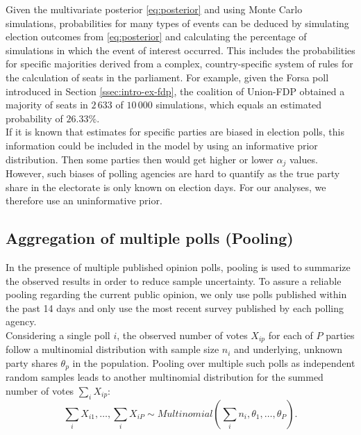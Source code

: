 \documentclass[smallcondensed]{svjour3}     %
\begin{document}
Given the multivariate posterior \eqref{eq:posterior} and using Monte Carlo simulations,
probabilities for many types of events can be deduced by simulating election outcomes
from \eqref{eq:posterior} and calculating the percentage of simulations in which the
event of interest occurred. This includes the probabilities for specific
majorities derived from a complex, country-specific system of rules for the
calculation of seats in the parliament. For example, given the Forsa poll
introduced in Section \ref{ssec:intro-ex-fdp}, the coalition of Union-FDP
obtained a majority of seats in $2\,633$ of $10\,000$ simulations, which equals
an estimated probability of $26.33\%$.\\

If it is known that estimates for specific parties are biased in election polls,
this information could be included in the model by using an informative prior distribution.
Then some  parties then would get higher or lower $\alpha_j$ values.
However, such biases of polling agencies are hard to quantify as the true party
share in the electorate is only known on election days. For our analyses, we
therefore use an uninformative prior.


\subsection{Aggregation of multiple polls (Pooling)} \label{sec:pooling}
In the presence of multiple published opinion polls, pooling is used to
summarize the observed results in order to reduce sample uncertainty.
To assure a reliable pooling regarding the current public opinion,
we only use polls published within the past 14 days and only use the
most recent survey published by each polling agency.\\

Considering a single poll $i$, the observed number of votes $X_{ip}$ for each of
$P$ parties follow a multinomial distribution with sample size $n_i$ and underlying,
unknown party shares $\theta_p$ in the population.
Pooling over multiple such polls as independent random samples leads to another
multinomial distribution for the summed number of votes $\sum_i X_{ip}$:
\begin{equation}
\sum\limits_i X_{i1},\ldots, \sum\limits_i X_{iP}
  \sim Multinomial \left( \sum\limits_i n_i,\theta_1,\ldots,\theta_P\right).
\end{equation}
\end{document}

